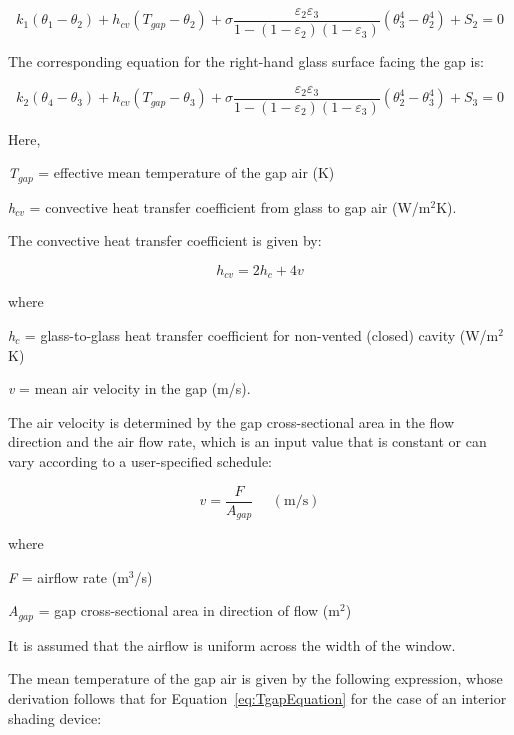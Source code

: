 \begin{equation}
{k_1}({\theta_1} - {\theta_2}) + {h_{cv}}({T_{gap}} - {\theta_2}) + \sigma \frac{{{\varepsilon_2}{\varepsilon_3}}}{{1 - (1 - {\varepsilon_2})(1 - {\varepsilon_3})}}\left( {\theta_3^4 - \theta_2^4} \right) + {S_2} = 0
\end{equation}

The corresponding equation for the right-hand glass surface facing the gap is:

\begin{equation}
{k_2}({\theta_4} - {\theta_3}) + {h_{cv}}({T_{gap}} - {\theta_3}) + \sigma \frac{{{\varepsilon_2}{\varepsilon_3}}}{{1 - (1 - {\varepsilon_2})(1 - {\varepsilon_3})}}\left( {\theta_2^4 - \theta_3^4} \right) + {S_3} = 0
\end{equation}

Here,

\emph{T\(_{gap}\)} = effective mean temperature of the gap air (K)

\emph{h\(_{cv}\)} = convective heat transfer coefficient from glass to gap air (W/m\(^{2}\)K).

The convective heat transfer coefficient is given by:

\begin{equation}
{h_{cv}} = 2{h_c} + 4v
\end{equation}

where

\emph{h\(_{c}\)} = glass-to-glass heat transfer coefficient for non-vented (closed) cavity (W/m\(^{2}\)K)

\emph{v} = mean air velocity in the gap (m/s).

The air velocity is determined by the gap cross-sectional area in the flow direction and the air flow rate, which is an input value that is constant or can vary according to a user-specified schedule:

\begin{equation}
v = \frac{F}{{{A_{gap}}}}{\mathrm{~~~~~~(m/s)}}
\end{equation}

where

\emph{F} = airflow rate (m\(^{3}\)/s)

\emph{A\(_{gap}\)} = gap cross-sectional area in direction of flow (m\(^{2}\))

It is assumed that the airflow is uniform across the width of the window.

The mean temperature of the gap air is given by the following expression, whose derivation follows that for Equation~\ref{eq:TgapEquation} for the case of an interior shading device:

